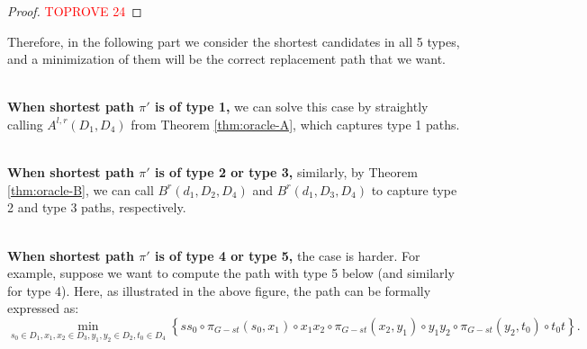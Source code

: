\documentclass[11pt]{article}
\theoremstyle{plain}
\theoremstyle{definition}
\begin{document}
\begin{center}
 \end{center}

\begin{proof}\textcolor{red}{TOPROVE 24}\end{proof}

{
Therefore, in the following part we consider the shortest candidates in all 5 types, and a minimization of them will be the correct replacement path that we want.
}

~\\
\noindent\textbf{When shortest path $\pi'$ is of type 1,} we can solve this case by straightly calling $A^{l,r}(D_1,D_4)$ from Theorem \ref{thm:oracle-A}, which captures type 1 paths.





~\\
\noindent\textbf{When shortest path $\pi'$ is of type 2 or type 3,} similarly, by Theorem \ref{thm:oracle-B}, we can call $B^r(d_1,D_2,D_4)$ and $B^r(d_1,D_3,D_4)$ to capture type 2 and type 3 paths, respectively.



~\\
\noindent\textbf{When shortest path $\pi'$ is of type 4 or type 5,} the case is harder. For example, suppose we want to compute the path with type 5 below (and similarly for type 4). Here, as illustrated in the above figure, the path can be formally expressed as:
$$\min_{s_0\in D_1, x_1, x_2\in D_3, y_1, y_2\in D_2, t_0\in D_4} \left\{s s_0 \circ \pi_{G-st}(s_0, x_1) \circ x_1x_2 \circ \pi_{G-st}(x_2, y_1) \circ y_1y_2 \circ \pi_{G-st}(y_2, t_0) \circ t_0t \right\}. $$
\end{document}
